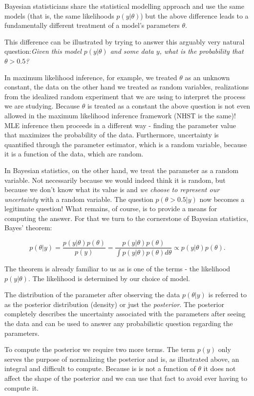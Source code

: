 \documentclass{book}
\theoremstyle{plain}%
\theoremstyle{definition}
\begin{document}
Bayesian statisticians share the statistical modelling approach and use the same models (that is, the same likelihoods $p(y|\theta)$) but the above difference leads to a fundamentally different treatment of a model's parameters $\theta$.

This difference can be illustrated by trying to answer this arguably very natural question:\emph{Given this model $p(y|\theta)$ and some data $y$, what is the probability that $\theta > 0.5$?} 

In maximum likelihood inference, for example, we treated $\theta$ as an unknown constant, the data on the other hand we treated as random variables, realizations from the idealized random experiment that we are using to interpret the process we are studying.    Because $\theta$ is treated as a constant the above question is not even allowed in the maximum likelihood inference framework (NHST is the same)! MLE inference then proceeds in a different way - finding the parameter value that maximizes the probability of the data. Furthermore, uncertainty is quantified through the parameter estimator, which is a random variable, because it is a function of the data, which are random.

In Bayesian statistics, on the other hand, we treat the parameter as a random variable. Not necessarily because we would indeed think it is random, but because we don't know what its value is and \emph{we choose to represent our uncertainty} with a random variable. The question $p(\theta > 0.5|y)$ now becomes a legitimate question! What remains, of course, is to provide a means for computing the answer. For that we turn to the cornerstone of Bayesian statistics, Bayes' theorem:

$$p(\theta|y) = \frac{p(y|\theta)p(\theta)}{p(y)} = \frac{p(y|\theta)p(\theta)}{\int p(y|\theta)p(\theta)d\theta} \propto p(y|\theta)p(\theta).$$

The theorem is already familiar to us as is one of the terms - the likelihood $p(y|\theta)$. The likelihood is determined by our choice of model.

The distribution of the parameter after observing the data $p(\theta|y)$ is referred to as the posterior distribution (density) or just the \emph{posterior}. The posterior completely describes the uncertainty associated with the parameters after seeing the data and can be used to answer any probabilistic question regarding the parameters.

To compute the posterior we require two more terms. The term $p(y)$ only serves the purpose of normalizing the posterior and is, as illustrated above, an integral and difficult to compute. Because is is not a function of $\theta$ it does not affect the shape of the posterior and we can use that fact to avoid ever having to compute it.
\end{document}
